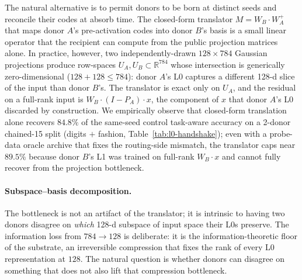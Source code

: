 \documentclass[11pt]{article}
\begin{document}
The natural alternative is to permit donors to be born at distinct
seeds and reconcile their codes at absorb time. The closed-form
translator $M = W_B \cdot W_A^{+}$ that maps donor $A$'s pre-activation
codes into donor $B$'s basis is a small linear operator that the
recipient can compute from the public projection matrices alone. In
practice, however, two independently-drawn $128 \times 784$ Gaussian
projections produce row-spaces $U_A, U_B \subset \mathbb{R}^{784}$
whose intersection is generically zero-dimensional ($128 + 128 \le
784$): donor $A$'s L0 captures a different 128-d slice of the input
than donor $B$'s. The translator is exact only on $U_A$, and the
residual on a full-rank input is $W_B \cdot (I - P_A) \cdot x$, the
component of $x$ that donor $A$'s L0 discarded by construction. We
empirically observe that closed-form translation alone recovers
$84.8\%$ of the same-seed control task-aware accuracy on a 2-donor
chained-15 split (digits $+$ fashion, Table~\ref{tab:l0-handshake});
even with a probe-data oracle archive that fixes the routing-side
mismatch, the translator caps near $89.5\%$ because donor $B$'s L1 was
trained on full-rank $W_B \cdot x$ and cannot fully recover from the
projection bottleneck.

\paragraph{Subspace--basis decomposition.}
The bottleneck is not an artifact of the translator; it is intrinsic
to having two donors disagree on \emph{which} 128-d subspace of input
space their L0s preserve. The information loss from $784 \to 128$ is
deliberate: it is the information-theoretic floor of the substrate, an
irreversible compression that fixes the rank of every L0 representation
at $128$. The natural question is whether donors can disagree on
something that does not also lift that compression bottleneck.
\end{document}
